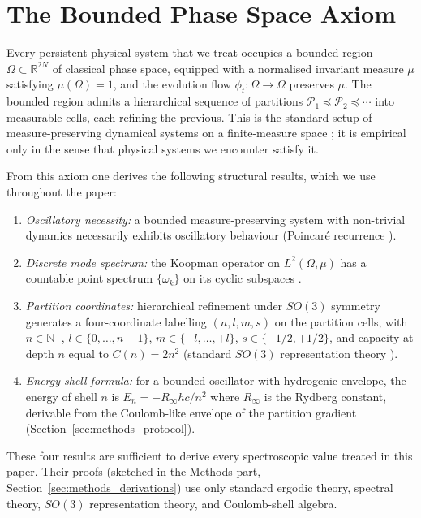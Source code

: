 \documentclass[11pt,a4paper]{article}
\theoremstyle{stmtstyle}
\theoremstyle{definition}
\theoremstyle{remark}
\newcommand{\Real}{\mathbb{R}}
\newcommand{\Natural}{\mathbb{N}}
\begin{document}
\section{The Bounded Phase Space Axiom}
\label{sec:axiom}

Every persistent physical system that we treat occupies a bounded region $\Omega \subset \Real^{2N}$ of classical phase space, equipped with a normalised invariant measure $\mu$ satisfying $\mu(\Omega) = 1$, and the evolution flow $\phi_{t}: \Omega \to \Omega$ preserves $\mu$. The bounded region admits a hierarchical sequence of partitions $\mathcal{P}_{1} \preceq \mathcal{P}_{2} \preceq \cdots$ into measurable cells, each refining the previous. This is the standard setup of measure-preserving dynamical systems on a finite-measure space \citep{walters1982}; it is empirical only in the sense that physical systems we encounter satisfy it.

From this axiom one derives the following structural results, which we use throughout the paper:

\begin{enumerate}[label=(R\arabic*),nosep]
\item \emph{Oscillatory necessity:} a bounded measure-preserving system with non-trivial dynamics necessarily exhibits oscillatory behaviour (Poincar\'e recurrence \citep{poincare1890,walters1982}).
\item \emph{Discrete mode spectrum:} the Koopman operator on $L^{2}(\Omega, \mu)$ has a countable point spectrum $\{\omega_{k}\}$ on its cyclic subspaces \citep{koopman1931,reed1980}.
\item \emph{Partition coordinates:} hierarchical refinement under $SO(3)$ symmetry generates a four-coordinate labelling $(n, l, m, s)$ on the partition cells, with $n \in \Natural^{+}$, $l \in \{0, \ldots, n-1\}$, $m \in \{-l, \ldots, +l\}$, $s \in \{-1/2, +1/2\}$, and capacity at depth $n$ equal to $C(n) = 2n^{2}$ (standard $SO(3)$ representation theory \citep{wigner1959,naimark1964}).
\item \emph{Energy-shell formula:} for a bounded oscillator with hydrogenic envelope, the energy of shell $n$ is $E_{n} = -R_{\infty} hc / n^{2}$ where $R_{\infty}$ is the Rydberg constant, derivable from the Coulomb-like envelope of the partition gradient (Section~\ref{sec:methods_protocol}).
\end{enumerate}

These four results are sufficient to derive every spectroscopic value treated in this paper. Their proofs (sketched in the Methods part, Section~\ref{sec:methods_derivations}) use only standard ergodic theory, spectral theory, $SO(3)$ representation theory, and Coulomb-shell algebra.
\end{document}
